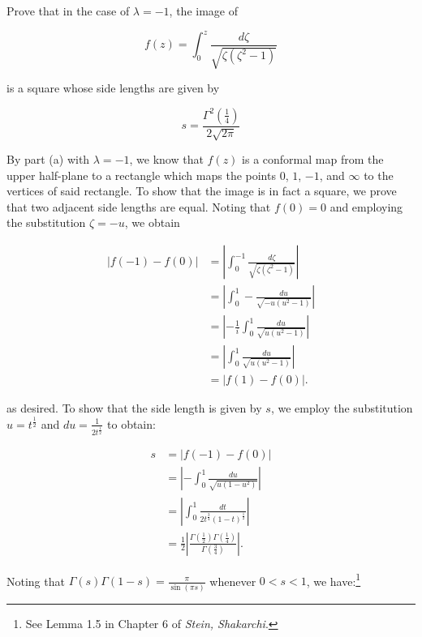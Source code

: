 Prove that in the case of $\lambda = -1$, the image of

$$
f(z) = \int_0^z \frac{d\zeta}{\sqrt{\zeta (\zeta^2 - 1)}}
$$

is a square whose side lengths are given by

$$
s = \frac{\Gamma^2\left(\frac{1}{4}\right)}{2 \sqrt{2 \pi}}
$$

\begin{solution}
    By part (a) with $\lambda = -1$, we know that $f(z)$ is a conformal map from the upper half-plane to a rectangle
    which maps the points $0$, $1$, $-1$, and $\infty$ to the vertices of said rectangle. To show that the image is in 
    fact a square, we prove that two adjacent side lengths are equal. Noting that $f(0) = 0$ and employing the 
    substitution $\zeta = -u$, we obtain

    \begin{align*}
        \left| f(-1) - f(0) \right| &= \left| \int_0^{-1} \frac{d\zeta}{\sqrt{\zeta(\zeta^2 - 1)}} \right| \\
                                    &= \left| \int_0^{1} -\frac{du}{\sqrt{-u(u^2 - 1)}} \right| \\
                                    &= \left| -\frac{1}{i} \int_0^{1} \frac{du}{\sqrt{u(u^2 - 1)}} \right| \\
                                    &= \left| \int_0^{1} \frac{du}{\sqrt{u(u^2 - 1)}} \right| \\
                                    &= \left| f(1) - f(0) \right|.
    \end{align*}

    as desired. To show that the side length is given by $s$, we employ the substitution $u = t^{\frac{1}{2}}$ and 
    $du = \frac{1}{2 t^{\frac{1}{2}}}$ to obtain:

    \begin{align*}
        s &= \left| f(-1) - f(0) \right| \\
          &= \left| - \int_0^1 \frac{du}{\sqrt{u (1 - u^2)}} \right| \\
          &= \left| \int_0^1 \frac{dt}{2 t^{\frac{3}{4}} (1 - t)^{\frac{1}{2}}} \right| \\
          &= \frac{1}{2} \left| \frac{\Gamma\left(\frac{1}{2}\right)\Gamma\left(\frac{1}{4}\right)}{\Gamma\left(\frac{3}{4}\right)} \right|.
    \end{align*}

    \pagebreak
    Noting that $\Gamma(s) \Gamma(1 - s) = \frac{\pi}{\sin(\pi s)}$ whenever $0 < s < 1$, we have:\footnote{
        See Lemma 1.5 in Chapter 6 of \textit{Stein, Shakarchi}.
    }


\end{solution}
